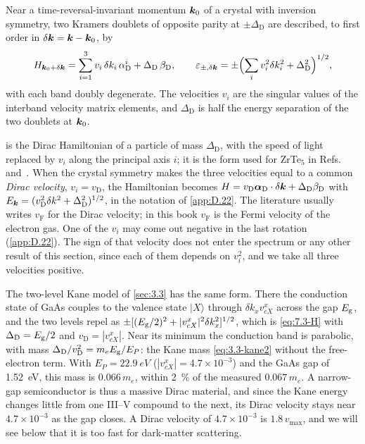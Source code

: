 \begin{keyresult}
Near a time-reversal-invariant momentum $\bm{k}_0$ of a crystal with inversion symmetry, two Kramers doublets of opposite parity at $\pm\Delta_{\mathrm{D}}$ are described, to first order in $\delta\bm{k} = \bm{k} - \bm{k}_0$, by
\begin{equation}
  H_{\bm{k}_0+\delta\bm{k}} = \sum_{i=1}^{3}v_i\,\delta k_i\,\alpha_{\mathrm{D}}^i + \Delta_{\mathrm{D}}\,\beta_{\mathrm{D}} , \qquad
  \varepsilon_{\pm,\delta\bm{k}} = \pm\Bigl(\sum_iv_i^2\delta k_i^2 + \Delta_{\mathrm{D}}^2\Bigr)^{1/2} ,
  \label{eq:7.3-H}
\end{equation}
with each band doubly degenerate. The velocities $v_i$ are the singular values of the interband velocity matrix elements, and $\Delta_{\mathrm{D}}$ is half the energy separation of the two doublets at $\bm{k}_0$.
\end{keyresult}
 is the Dirac Hamiltonian of a particle of mass $\Delta_{\mathrm{D}}$, with the speed of light replaced by $v_i$ along the principal axis $i$; it is the form used for ZrTe$_5$ in Refs.~\cite[Eq.~(1.1)]{geilhufe2020dirac} and~\cite{hochberg2018detection}. When the crystal symmetry makes the three velocities equal to a common \emph{Dirac velocity}, $v_i = v_{\mathrm{D}}$, the Hamiltonian becomes $H = v_{\mathrm{D}}\boldsymbol{\alpha}_{\mathrm{D}}\cdot\delta\bm{k} + \Delta_{\mathrm{D}}\beta_{\mathrm{D}}$ with $E_{\bm{k}} = (v_{\mathrm{D}}^2\delta k^2 + \Delta_{\mathrm{D}}^2)^{1/2}$, in the notation of \cref{app:D.22}. The literature usually writes $v_{\mathrm{F}}$ for the Dirac velocity; in this book $v_{\mathrm{F}}$ is the Fermi velocity of the electron gas. One of the $v_i$ may come out negative in the last rotation (\cref{app:D.22}). The sign of that velocity does not enter the spectrum or any other result of this section, since each of them depends on $v_i^2$, and we take all three velocities positive.

The two-level Kane model of \cref{sec:3.3} has the same form. There the conduction state of GaAs couples to the valence state $|X\rangle$ through $\delta k_xv^x_{cX}$ across the gap $E_{\mathrm{g}}$, and the two levels repel as $\pm[(E_{\mathrm{g}}/2)^2 + |v^x_{cX}|^2\delta k_x^2]^{1/2}$, which is \cref{eq:7.3-H} with $\Delta_{\mathrm{D}} = E_{\mathrm{g}}/2$ and $v_{\mathrm{D}} = |v^x_{cX}|$. Near its minimum the conduction band is parabolic, with mass $\Delta_{\mathrm{D}}/v_{\mathrm{D}}^2 = m_eE_{\mathrm{g}}/E_P$: the Kane mass \cref{eq:3.3-kane2} without the free-electron term. With $E_P = \SI{22.9}{eV}$ ($|v^x_{cX}| = 4.7\times10^{-3}$) and the GaAs gap of \SI{1.52}{eV}, this mass is $0.066\,m_e$, within \SI{2}{\percent} of the measured $0.067\,m_e$. A narrow-gap semiconductor is thus a massive Dirac material, and since the Kane energy changes little from one III--V compound to the next, its Dirac velocity stays near $4.7\times10^{-3}$ as the gap closes. A Dirac velocity of $4.7\times10^{-3}$ is $1.8\,v_{\mathrm{max}}$, and we will see below that it is too fast for dark-matter scattering.

